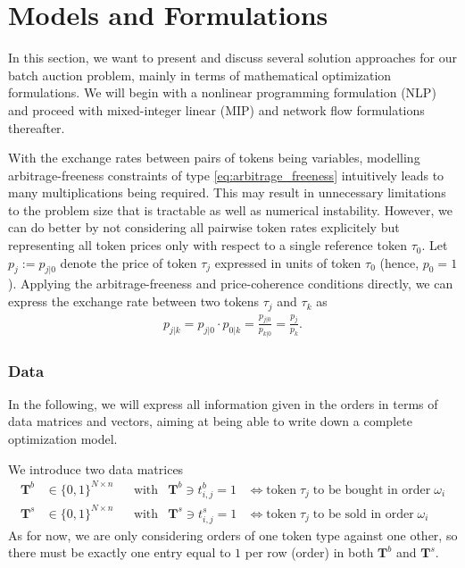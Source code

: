 \documentclass[11pt,parskip=full]{scrartcl}%
\begin{document}
\clearpage
\section{Models and Formulations}
\label{sec:models}

In this section, we want to present and discuss several solution approaches for our batch auction
problem, mainly in terms of mathematical optimization formulations.
We will begin with a nonlinear programming formulation (NLP) and proceed with mixed-integer linear
(MIP) and network flow formulations thereafter.

With the exchange rates between pairs of tokens being variables, modelling arbitrage-freeness
constraints of type \eqref{eq:arbitrage_freeness} intuitively leads to many multiplications being
required.
This may result in unnecessary limitations to the problem size that is tractable as well as
numerical instability.
However, we can do better by not considering all pairwise token rates explicitely but representing
all token prices only with respect to a single reference token $ \tau_0 $.
Let $ p_j := p_{j|0} $ denote the price of token $ \tau_j $ expressed in units of token $ \tau_0 $ 
(hence, $ p_0 = 1 $).
Applying the arbitrage-freeness and price-coherence conditions directly, we can express the
exchange rate between two tokens $ \tau_j $ and $ \tau_k $ as
\begin{align}
  p_{j|k} = p_{j|0} \cdot p_{0|k} = \frac{p_{j|0}}{p_{k|0}} = \frac{p_j}{p_k}.
\end{align}

\subsubsection*{Data}

In the following, we will express all information given in the orders in terms of data
matrices and vectors, aiming at being able to write down a complete optimization model.

We introduce two data matrices
\begin{align*}
  \mathbf{T}^b &\in \{0,1\}^{N \times n} && \text{with} & \mathbf{T}^b \ni t^b_{i,j} = 1
  &\Leftrightarrow
  \text{token} \; \tau_j \; \text{to be bought in order} \; \omega_i \\
  \mathbf{T}^s &\in \{0,1\}^{N \times n} && \text{with} & \mathbf{T}^s \ni t^s_{i,j} = 1
  &\Leftrightarrow
  \text{token} \; \tau_j \; \text{to be sold in order} \; \omega_i
\end{align*}
As for now, we are only considering orders of one token type against one other, so there must be
exactly one entry equal to $ 1 $ per row (order) in both $ \mathbf{T}^b $ and $ \mathbf{T}^s $.
\end{document}
